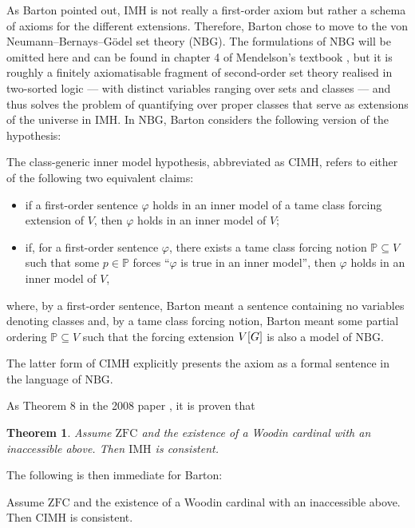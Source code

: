 \documentclass[12pt]{article}
\theoremstyle{plain}
\newtheorem{theorem}{Theorem}[section]
\theoremstyle{definition}
\newcommand{\ZFC}{\mathrm{ZFC}}
\newcommand{\NBG}{\mathrm{NBG}}
\newcommand{\IMH}{\mathrm{IMH}}
\newcommand{\CIMH}{\mathrm{CIMH}}
\begin{document}
As Barton pointed out, $\IMH$ is not really a first-order axiom but rather a schema of axioms for the different extensions. Therefore, Barton chose to move to the von Neumann--Bernays--G\"odel set theory ($\NBG$). The formulations of $\NBG$ will be omitted here and can be found in chapter 4 of Mendelson's textbook \cite{mendelson}, but it is roughly a finitely axiomatisable fragment of second-order set theory realised in two-sorted logic --- with distinct variables ranging over sets and classes --- and thus solves the problem of quantifying over proper classes that serve as extensions of the universe in $\IMH$. In $\NBG$, Barton considers the following version of the hypothesis:

\begin{definition}
	The class-generic inner model hypothesis, abbreviated as $\CIMH$, refers to either of the following two equivalent claims:
	\begin{itemize}
		\item if a first-order sentence $\varphi$ holds in an inner model of a tame class forcing extension of $V$,  then $\varphi$ holds in an inner model of $V$;
		\item if, for a first-order sentence $\varphi$, there exists a tame class forcing notion $\mathbb{P} \subseteq V$ such that some $p \in \mathbb{P}$ forces ``$\varphi$ is true in an inner model'', then $\varphi$ holds in an inner model of $V$,
	\end{itemize}
	where, by a first-order sentence, Barton meant a sentence containing no variables denoting classes and, by a tame class forcing notion, Barton meant some partial ordering $\mathbb{P} \subseteq V$ such that the forcing extension $V\mleft[G\mright]$ is also a model of $\NBG$.
\end{definition}

The latter form of $\CIMH$ explicitly presents the axiom as a formal sentence in the language of $\NBG$.

As Theorem 8 in the 2008 paper \cite{friedman-imh-08}, it is proven that

\begin{theorem}
	\label{thm:imh-consistent}
	Assume $\ZFC$ and the existence of a Woodin cardinal with an inaccessible above. Then $\IMH$ is consistent.
\end{theorem}

The following is then immediate for Barton:

\begin{corollary}
	Assume $\ZFC$ and the existence of a Woodin cardinal with an inaccessible above. Then $\CIMH$ is consistent.
\end{corollary}
\end{document}
